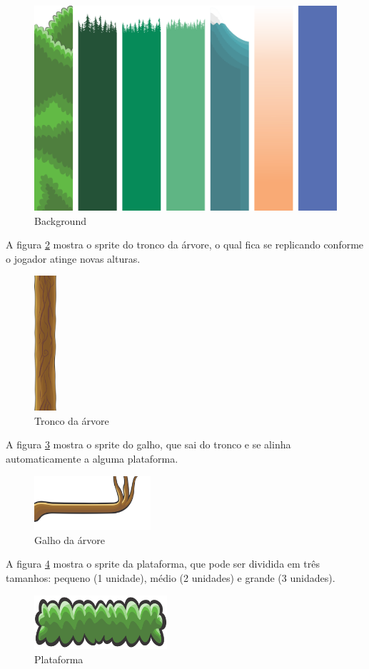 \documentclass[12pt]{article}
\begin{document}
	\begin{figure}[ht]
		\centering
		\includegraphics[width=.5\textwidth]{imagens/Background}
		\caption{Background}
		\label{fig:background}
	\end{figure}
	
	A figura \ref{fig:tronco} mostra o sprite do tronco da árvore, o qual fica se replicando conforme o jogador atinge novas alturas. 	
	\begin{figure}[ht]
		\centering
		\includegraphics[height=5cm]{imagens/Bole}
		\caption{Tronco da árvore}
		\label{fig:tronco}
	\end{figure}
	
	A figura \ref{fig:galho} mostra o sprite do galho, que sai do tronco e se alinha automaticamente a alguma plataforma.
	\begin{figure}[ht]
		\centering
		\includegraphics[height=2cm]{imagens/branch}
		\caption{Galho da árvore}
		\label{fig:galho}
	\end{figure}

	A figura \ref{fig:plataforma} mostra o sprite da plataforma, que pode ser dividida em três tamanhos: pequeno (1 unidade), médio (2 unidades) e grande (3 unidades).
	\begin{figure}[ht]
		\centering
		\includegraphics[height=2cm]{imagens/Platform2}
		\caption{Plataforma}
		\label{fig:plataforma}
	\end{figure}
			
\end{document}
